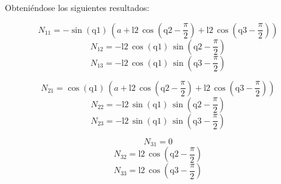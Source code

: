  	 Obteniéndose los siguientes resultados:
 	 
	\begin{equation}
	N_{11} = - \sin\!\left(\mathrm{q1}\right)\, \left(a + \mathrm{l2}\, \cos\!\left(\mathrm{q2} - \frac{\pi}{2}\right) + \mathrm{l2}\, \cos\!\left(\mathrm{q3} - \frac{\pi}{2}\right)\right)
	\end{equation}
	\begin{equation}
	N_{12} = - \mathrm{l2}\, \cos\!\left(\mathrm{q1}\right)\, \sin\!\left(\mathrm{q2} - \frac{\pi}{2}\right)
	\end{equation}
	\begin{equation}
	N_{13} = - \mathrm{l2}\, \cos\!\left(\mathrm{q1}\right)\, \sin\!\left(\mathrm{q3} - \frac{\pi}{2}\right)
	\end{equation}

 	 
 	 \begin{equation}
 	 N_{21} = \cos\!\left(\mathrm{q1}\right)\, \left(a + \mathrm{l2}\, \cos\!\left(\mathrm{q2} - \frac{\pi}{2}\right) + \mathrm{l2}\, \cos\!\left(\mathrm{q3} - \frac{\pi}{2}\right)\right)
 	 \end{equation}
 	 \begin{equation}
 	 N_{22} = - \mathrm{l2}\, \sin\!\left(\mathrm{q1}\right)\, \sin\!\left(\mathrm{q2} - \frac{\pi}{2}\right)
 	 \end{equation}
 	 \begin{equation}
 	 N_{23} = - \mathrm{l2}\, \sin\!\left(\mathrm{q1}\right)\, \sin\!\left(\mathrm{q3} - \frac{\pi}{2}\right)
 	 \end{equation}

 	 
 	 \begin{equation}
 	 N_{31} = 0
 	 \end{equation}
 	 \begin{equation}
 	 N_{32} = \mathrm{l2}\, \cos\!\left(\mathrm{q2} - \frac{\pi}{2}\right)
 	 \end{equation}
 	 \begin{equation}
 	 N_{33} = \mathrm{l2}\, \cos\!\left(\mathrm{q3} - \frac{\pi}{2}\right)
 	 \end{equation}

